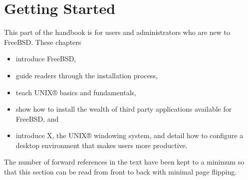 \part{Getting Started}
This part of the handbook is for users and administrators who are new to
FreeBSD.
These chapters
\begin{itemize}
\item
   introduce FreeBSD,
\item
   guide readers through the installation process,
\item
   teach UNIX® basics and fundamentals,
\item
   show how to install the wealth of third party applications available for
   FreeBSD, and
\item
   introduce X, the UNIX® windowing system, and detail how to configure a
   desktop environment that makes users more productive.
\end{itemize}
The number of forward references in the text have been kept to a minimum so that
this section can be read from front to back with minimal page flipping.